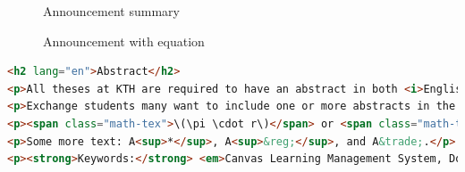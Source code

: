 \begin{figure}[!ht]
  \begin{center}
  \end{center}
  \caption{Announcement summary}
  \label{fig:announcementSummary}
\end{figure}
\FloatBarrier

\begin{figure}[!ht]
  \begin{center}
  \end{center}
  \caption{Announcement with equation}
  \label{fig:announcementWithEquation}
\end{figure}
\FloatBarrier
{}
\begin{lstlisting}[language={HTML}, caption={HTML for the announcement}, label=lst:HTMLannouncement]
<h2 lang="en">Abstract</h2>
<p>All theses at KTH are required to have an abstract in both <i>English</i> and <i>Swedish</i>.</p>
<p>Exchange students many want to include one or more abstracts in the language(s) used in their home institutions to avoid the need to write another thesis when returning to their home institution.</p>
<p><span class="math-tex">\(\pi \cdot r\)</span> or <span class="math-tex">\[ \int_{a}^{b} x^2 \,dx \]</span></p>
<p>Some more text: A<sup>*</sup>, A<sup>&reg;</sup>, and A&trade;.</p>
<p><strong>Keywords:</strong> <em>Canvas Learning Management System, Docker containers, Performance tuning </em></p>
\end{lstlisting}


